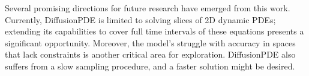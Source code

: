 \documentclass[square]{article}
\begin{document}
Several promising directions for future research have emerged from this work. Currently, DiffusionPDE is limited to solving slices of 2D dynamic PDEs; extending its capabilities to cover full time intervals of these equations presents a significant opportunity. Moreover, the model’s struggle with accuracy in spaces that lack constraints is another critical area for exploration. DiffusionPDE also suffers from a slow sampling procedure, and a faster solution might be desired.


\newpage
% 
% 



\newpage

\end{document}

